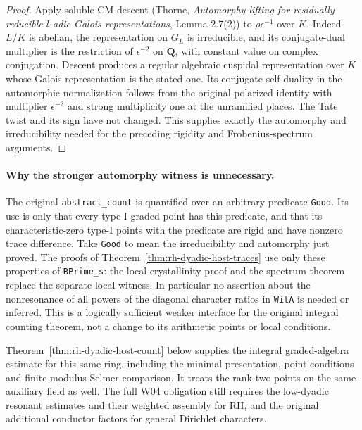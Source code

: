 \begin{proof}
Apply soluble CM descent
(Thorne, \emph{Automorphy lifting for residually reducible
$l$-adic Galois representations}, Lemma 2.7(2))
to $\rho\epsilon^{-1}$ over $K$.
Indeed $L/K$ is abelian, the representation on $G_L$
is irreducible, and its conjugate-dual multiplier is the
restriction of $\epsilon^{-2}$ on $\mathbf Q$, with
constant value on complex conjugation.  Descent produces
a regular algebraic cuspidal representation over $K$
whose Galois representation is the stated one.
Its conjugate self-duality in the automorphic normalization
follows from the original polarized identity with multiplier
$\epsilon^{-2}$ and strong multiplicity one at the
unramified places.  The Tate twist and its sign have
not changed.  This supplies exactly the automorphy and
irreducibility needed for the preceding rigidity and
Frobenius-spectrum arguments.
\end{proof}

\paragraph{Why the stronger automorphy witness is unnecessary.}
The original \texttt{abstract\_count} is quantified over an
arbitrary predicate \texttt{Good}.  Its use is only that every
type-I graded point has this predicate, and that its
characteristic-zero type-I points with the predicate are rigid
and have nonzero trace difference.  Take \texttt{Good} to mean
the irreducibility and automorphy just proved.  The proofs of
Theorem~\ref{thm:rh-dyadic-host-traces} use only these properties
of \texttt{BPrime\_s}: the local crystallinity proof and
the spectrum theorem replace the separate local witness.
In particular no assertion about the nonresonance of
all powers of the diagonal character ratios in
\texttt{WitA} is needed or inferred.  This is a logically
sufficient weaker interface for the original integral
counting theorem, not a change to its arithmetic points
or local conditions.

Theorem~\ref{thm:rh-dyadic-host-count} below supplies the integral
graded-algebra estimate for this same ring, including the minimal
presentation, point conditions and finite-modulus Selmer comparison.
It treats the rank-two points on the same auxiliary field as well.
The full W04 obligation still requires the low-dyadic resonant
estimates and their weighted assembly for RH, and the original
additional conductor factors for general Dirichlet characters.
